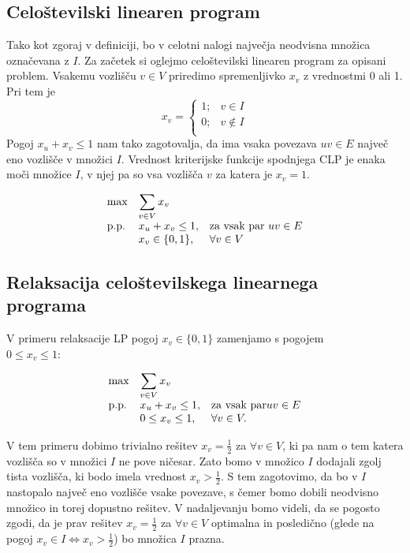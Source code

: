 \documentclass[a4paper, 12 pt]{article}
\theoremstyle{definition}
\theoremstyle{plain}
\theoremstyle{remark}
\begin{document}
\subsection{Celoštevilski linearen program}
Tako kot zgoraj v definiciji, bo v celotni nalogi največja neodvisna množica označevana z $I$. Za začetek si oglejmo celoštevilski linearen program za opisani problem.  Vsakemu vozlišču $v \in V$ priredimo spremenljivko $x_v$ z vrednostmi 0 ali 1. Pri tem je 
\[   
x_v = 
     \begin{cases}
       1; &v \in I \\
       0; &v \notin I\\
     \end{cases}
\]
Pogoj $x_u + x_v \leq 1$ nam tako zagotovalja, da ima vsaka povezava $uv \in E$ največ eno vozlišče v množici $I$. Vrednost kriterijske funkcije spodnjega CLP je enaka moči množice $I$, v njej pa so vsa vozlišča $v$ za katera je $x_v = 1$.

\begin{equation*}
\begin{array}{ll@{}ll}
\text{max}  & \displaystyle\sum\limits_{v\in V} x_v &&\\
\text{p.p.}	 & x_u + x_v \leq 1,		 			&&\text{za vsak par } uv \in E \\
                 & x_v \in \{0,1\}, 	              			&&\forall v \in V
\end{array}
\end{equation*}




\subsection{Relaksacija celoštevilskega linearnega programa} \label{RCLP}
V primeru relaksacije LP pogoj $x_v \in \{0, 1\}$ zamenjamo s pogojem\\ $0 \leq x_v \leq 1$:

\begin{equation*}
\begin{array}{ll@{}ll}
\text{max}  	& \displaystyle\sum\limits_{v\in V} x_v &&\\
\text{p.p.}	& x_u + x_v \leq 1,		 				&&\text{za vsak par} uv \in E \\
                 	& 0 \leq x_v \leq 1, 	              			&&\forall v \in V.
\end{array}
\end{equation*}

V tem primeru dobimo trivialno rešitev $x_v = \frac{1}{2}$ za $\forall v \in V$, ki pa nam o tem katera vozlišča so v množici $I$ ne pove ničesar. Zato bomo v množico $I$ dodajali zgolj tista vozlišča, ki bodo imela vrednost $x_v > \frac{1}{2}$. S tem zagotovimo, da bo v $I$ nastopalo največ eno vozlišče vsake povezave, s čemer bomo dobili neodvisno množico in torej dopustno rešitev. V nadaljevanju bomo videli, da se pogosto zgodi, da je prav rešitev $x_v = \frac{1}{2}$ za $\forall v \in V$ optimalna in posledično (glede na pogoj $x_v \in I \iff x_v > \frac{1}{2}$) bo množica $I$ prazna.
 
\end{document}
